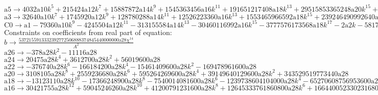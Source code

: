 \documentclass[12pt,a4paper,draft]{article}
\begin{document}
$\text{a5}\to 4032 \text{a10} k^5+215424 \text{a12} k^7+15887872 \text{a14} k^9+1545363456 \text{a16} k^{11}+191651217408 \text{a18} k^{13}+29515853365248 \text{a20} k^{15}+5526593941929984 \text{a22} k^{17}+1236393972835811328 \text{a24} k^{19}+325709541934503034880 \text{a26} k^{21}+99795859565893449154560 \text{a28} k^{23}+6 \text{a6} k+112 \text{a8} k^3$\\
$\text{a3}\to 32640 \text{a10} k^7+1745920 \text{a12} k^9+128780288 \text{a14} k^{11}+12526223360 \text{a16} k^{13}+1553465966592 \text{a18} k^{15}+239246490992640 \text{a20} k^{17}+44796883073761280 \text{a22} k^{19}+10021832059523170304 \text{a24} k^{21}+2640102104917816115200 \text{a26} k^{23}+808914769103121354326016 \text{a28} k^{25}+4 \text{a4} k+40 \text{a6} k^3+896 \text{a8} k^5$\\
$\text{C0}\to \text{a1}-79360 \text{a10} k^9-4245504 \text{a12} k^{11}-313155584 \text{a14} k^{13}-30460116992 \text{a16} k^{15}-3777576173568 \text{a18} k^{17}-2 \text{a2} k-581777702256640 \text{a20} k^{19}-108932957168730112 \text{a22} k^{21}-24370173276164456448 \text{a24} k^{23}-6419958484945407574016 \text{a26} k^{25}-1967044844910430876860416 \text{a28} k^{27}-8 \text{a4} k^3-96 \text{a6} k^5-2176 \text{a8} k^7$\\
Constraints on coefficients from real part of equation:
\\$b\to \frac{5372155913332392772506888374845440000000 \text{a28} \chi ^{14}}{A^2}$\\
$\text{a26}\to -378 \text{a28} k^2-11116 \text{a28}$\\
$\text{a24}\to 20475 \text{a28} k^4+3612700 \text{a28} k^2+56019600 \text{a28}$\\
$\text{a22}\to -376740 \text{a28} k^6-166184200 \text{a28} k^4-15461409600 \text{a28} k^2-169478961600 \text{a28}$\\
$\text{a20}\to 3108105 \text{a28} k^8+2559236680 \text{a28} k^6+595264269600 \text{a28} k^4+39149640129600 \text{a28} k^2+343529519773440 \text{a28}$\\
$\text{a18}\to -13123110 \text{a28} k^{10}-17366248900 \text{a28} k^8-7540014081600 \text{a28} k^6-1239738604104000 \text{a28} k^4-65270608756953600 \text{a28} k^2-493007322059965440 \text{a28}$\\
$\text{a16}\to 30421755 \text{a28} k^{12}+59045246260 \text{a28} k^{10}+41200791231600 \text{a28} k^8+12645333761860800 \text{a28} k^6+1664400523302316800 \text{a28} k^4+75430120275174712320 \text{a28} k^2+516028473557238558720 \text{a28}$\\
\end{document}
